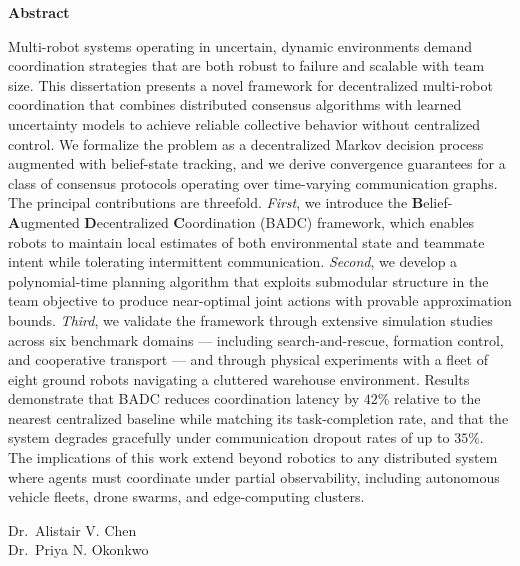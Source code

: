 \documentclass[12pt,oneside]{report}
\begin{document}
\thispagestyle{empty}
{}
\begin{center}
  {\LARGE\bfseries\color{jhublue} Abstract}
\end{center}
\vspace{16pt}

Multi-robot systems operating in uncertain, dynamic environments demand coordination
strategies that are both robust to failure and scalable with team size. This dissertation
presents a novel framework for decentralized multi-robot coordination that combines
distributed consensus algorithms with learned uncertainty models to achieve reliable
collective behavior without centralized control. We formalize the problem as a
decentralized Markov decision process augmented with belief-state tracking,
and we derive convergence guarantees for a class of consensus protocols operating
over time-varying communication graphs. The principal contributions are threefold.
\textit{First}, we introduce the \textbf{B}elief-\textbf{A}ugmented \textbf{D}ecentralized
\textbf{C}oordination (BADC) framework, which enables robots to maintain local
estimates of both environmental state and teammate intent while tolerating intermittent
communication. \textit{Second}, we develop a polynomial-time planning algorithm that
exploits submodular structure in the team objective to produce near-optimal joint
actions with provable approximation bounds. \textit{Third}, we validate the framework
through extensive simulation studies across six benchmark domains --- including
search-and-rescue, formation control, and cooperative transport --- and through physical
experiments with a fleet of eight ground robots navigating a cluttered warehouse
environment. Results demonstrate that BADC reduces coordination latency by
$42\%$ relative to the nearest centralized baseline while matching its task-completion
rate, and that the system degrades gracefully under communication dropout rates
of up to $35\%$. The implications of this work extend beyond robotics to any
distributed system where agents must coordinate under partial observability,
including autonomous vehicle fleets, drone swarms, and edge-computing clusters.

\vspace{28pt}

 \hspace{4pt} Dr.\ Alistair V. Chen\\
 \hspace{4pt} Dr.\ Priya N. Okonkwo
\end{document}
